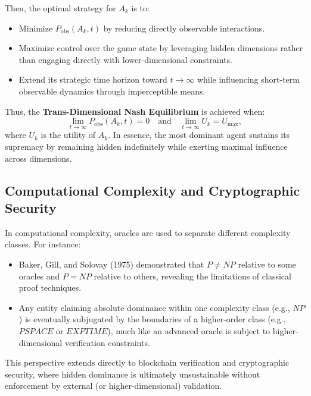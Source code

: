 \documentclass[11pt]{article}
\begin{document}
Then, the optimal strategy for \( A_k \) is to:
\begin{itemize}
    \item Minimize \( P_{\text{obs}}(A_k, t) \) by reducing directly observable interactions.
    \item Maximize control over the game state by leveraging hidden dimensions rather than engaging directly with lower-dimensional constraints.
    \item Extend its strategic time horizon toward \( t \to \infty \) while influencing short-term observable dynamics through imperceptible means.
\end{itemize}

Thus, the \textbf{Trans-Dimensional Nash Equilibrium} is achieved when:
\[
\lim_{t \to \infty} P_{\text{obs}}(A_k, t) = 0 \quad \text{and} \quad \lim_{t \to \infty} U_k = U_{\max},
\]
where \( U_k \) is the utility of \( A_k \). In essence, the most dominant agent sustains its supremacy by remaining hidden indefinitely while exerting maximal influence across dimensions.

\subsection{Computational Complexity and Cryptographic Security}
In computational complexity, oracles are used to separate different complexity classes. For instance:
\begin{itemize}
    \item Baker, Gill, and Solovay (1975) demonstrated that \( P \neq NP \) relative to some oracles and \( P = NP \) relative to others, revealing the limitations of classical proof techniques.
    \item Any entity claiming absolute dominance within one complexity class (e.g., \( NP \)) is eventually subjugated by the boundaries of a higher-order class (e.g., \( PSPACE \) or \( EXPTIME \)), much like an advanced oracle is subject to higher-dimensional verification constraints.
\end{itemize}
This perspective extends directly to blockchain verification and cryptographic security, where hidden dominance is ultimately unsustainable without enforcement by external (or higher-dimensional) validation.
\end{document}
